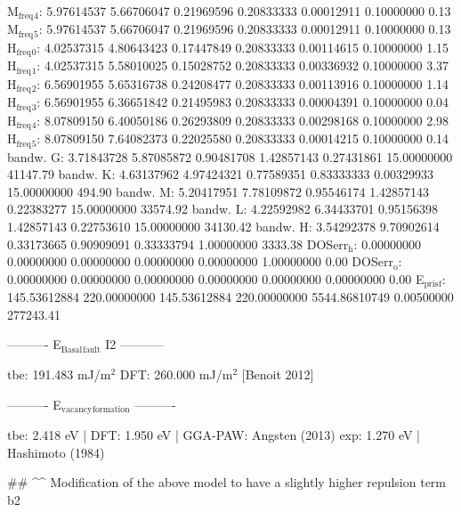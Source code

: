 \documentclass[11pt]{article}
\begin{document}
M\(_{\text{freq}}\)\(_{\text{4}}\):   5.97614537   5.66706047   0.21969596   0.20833333   0.00012911   0.10000000         0.13
M\(_{\text{freq}}\)\(_{\text{5}}\):   5.97614537   5.66706047   0.21969596   0.20833333   0.00012911   0.10000000         0.13
H\(_{\text{freq}}\)\(_{\text{0}}\):   4.02537315   4.80643423   0.17447849   0.20833333   0.00114615   0.10000000         1.15
H\(_{\text{freq}}\)\(_{\text{1}}\):   4.02537315   5.58010025   0.15028752   0.20833333   0.00336932   0.10000000         3.37
H\(_{\text{freq}}\)\(_{\text{2}}\):   6.56901955   5.65316738   0.24208477   0.20833333   0.00113916   0.10000000         1.14
H\(_{\text{freq}}\)\(_{\text{3}}\):   6.56901955   6.36651842   0.21495983   0.20833333   0.00004391   0.10000000         0.04
H\(_{\text{freq}}\)\(_{\text{4}}\):   8.07809150   6.40050186   0.26293809   0.20833333   0.00298168   0.10000000         2.98
H\(_{\text{freq}}\)\(_{\text{5}}\):   8.07809150   7.64082373   0.22025580   0.20833333   0.00014215   0.10000000         0.14
bandw. G:   3.71843728   5.87085872   0.90481708   1.42857143   0.27431861  15.00000000     41147.79
bandw. K:   4.63137962   4.97424321   0.77589351   0.83333333   0.00329933  15.00000000       494.90
bandw. M:   5.20417951   7.78109872   0.95546174   1.42857143   0.22383277  15.00000000     33574.92
bandw. L:   4.22592982   6.34433701   0.95156398   1.42857143   0.22753610  15.00000000     34130.42
bandw. H:   3.54292378   9.70902614   0.33173665   0.90909091   0.33333794   1.00000000      3333.38
DOSerr\(_{\text{h}}\):   0.00000000   0.00000000   0.00000000   0.00000000   0.00000000   1.00000000         0.00
DOSerr\(_{\text{o}}\):   0.00000000   0.00000000   0.00000000   0.00000000   0.00000000   0.00000000         0.00
E\(_{\text{pris}}\)\(_{\text{f}}\): 145.53612884 220.00000000 145.53612884 220.00000000 5544.86810749 0.00500000    277243.41


----------     E\(_{\text{Basal}}\)\(_{\text{fault}}\) I2     -----------

tbe:       191.483 mJ/m\(^{\text{2}}\)
DFT:       260.000 mJ/m\(^{\text{2}}\) [Benoit  2012]



----------     E\(_{\text{vacancy}}\)\(_{\text{formation}}\)     ----------

tbe:      2.418 eV  |
DFT:      1.950 eV  |  GGA-PAW: Angsten (2013) 
exp:      1.270 eV  |  Hashimoto (1984)




\#\# \^{}\^{} Modification of the above model to have a slightly higher repulsion term b2
\end{document}
